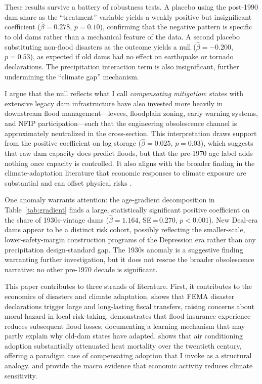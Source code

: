 \documentclass[12pt]{article}
\begin{document}
These results survive a battery of robustness tests. A placebo using the post-1990 dam share as the ``treatment'' variable yields a weakly positive but insignificant coefficient ($\hat{\beta} = 0.278$, $p = 0.10$), confirming that the negative pattern is specific to old dams rather than a mechanical feature of the data. A second placebo substituting non-flood disasters as the outcome yields a null ($\hat{\beta} = -0.200$, $p = 0.53$), as expected if old dams had no effect on earthquake or tornado declarations. The precipitation interaction term is also insignificant, further undermining the ``climate gap'' mechanism.

I argue that the null reflects what I call \emph{compensating mitigation}: states with extensive legacy dam infrastructure have also invested more heavily in downstream flood management---levees, floodplain zoning, early warning systems, and NFIP participation---such that the engineering obsolescence channel is approximately neutralized in the cross-section. This interpretation draws support from the positive coefficient on log storage ($\hat{\beta} = 0.025$, $p = 0.03$), which suggests that raw dam capacity does predict floods, but that the pre-1970 age label adds nothing once capacity is controlled. It also aligns with the broader finding in the climate-adaptation literature that economic responses to climate exposure are substantial and can offset physical risks \citep{burke2015,hsiang2017}.

One anomaly warrants attention: the age-gradient decomposition in Table~\ref{tab:gradient} finds a large, statistically significant positive coefficient on the share of 1930s-vintage dams ($\hat{\beta} = 1.164$, SE\,=\,0.270, $p < 0.001$). New Deal-era dams appear to be a distinct risk cohort, possibly reflecting the smaller-scale, lower-safety-margin construction programs of the Depression era rather than any precipitation design-standard gap. The 1930s anomaly is a suggestive finding warranting further investigation, but it does not rescue the broader obsolescence narrative: no other pre-1970 decade is significant.

This paper contributes to three strands of literature. First, it contributes to the economics of disasters and climate adaptation. \citet{deryugina2017} shows that FEMA disaster declarations trigger large and long-lasting fiscal transfers, raising concerns about moral hazard in local risk-taking. \citet{gallagher2014} demonstrates that flood insurance experience reduces subsequent flood losses, documenting a learning mechanism that may partly explain why old-dam states have adapted. \citet{barreca2016} shows that air conditioning adoption substantially attenuated heat mortality over the twentieth century, offering a paradigm case of compensating adoption that I invoke as a structural analogy. \citet{burke2015} and \citet{hsiang2017} provide the macro evidence that economic activity reduces climate sensitivity.
\end{document}
